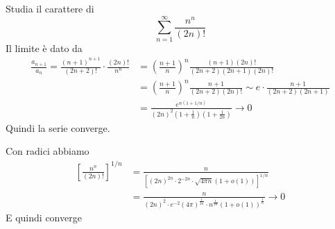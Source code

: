 \documentclass[a4paper]{article}
\begin{document}
\begin{snippetexample}{}
    Studia il carattere di
    \[
        \sum_{n=1}^\infty \frac{n^n}{(2n)!}
    \]
    Il limite è dato da
    \begin{align*}
        \frac{a_{n+1}}{a_n} = \frac{
            {(n+1)}^{n+1}
        }{
            (2n+2)!
        }
        \cdot
        \frac{
            (2n)!
        }{
            n^n
        }
        &=
        {\left(\frac{n+1}{n}\right)}^n
        \frac{
            (n+1)(2n)!
        }{
            (2n+2)(2n+1)(2n)!
        } \\
        &=
        {\left(\frac{n+1}{n}\right)}^n
        \frac{n+1}{(2n+2)(2n)!}
        \sim e \cdot  \frac{
            n+1
        }{
            (2n+2)(2n+1)
        } \\
        &= \frac{e^{n(1+1/n)}}{{(2n)}^2 {\left(1 + \frac{1}{n}\right)}{\left(1 + \frac{1}{2n}\right)}}
        \to 0
    \end{align*}
    Quindi la serie converge.

    Con radici abbiamo
    \begin{align*}
        {\left[\frac{n^n}{(2n)!}\right]}^{1/n}
        &= \frac{n}{
            {\left[
                {(2n)}^{2n}
                \cdot 2^{-2n} \cdot \sqrt{4\pi n}(1 + o(1))
            \right]}^{1/n}
        } \\
        &= \frac{n}{
            {(2n)}^2 \cdot e^{-2} {(4\pi)}^{\frac{1}{2n}}
            \cdot n^{\frac{1}{2n}}{(1 + o(1))}^{\frac{1}{n}}
        } \to 0
    \end{align*}
    E quindi converge
\end{snippetexample}
\end{document}
